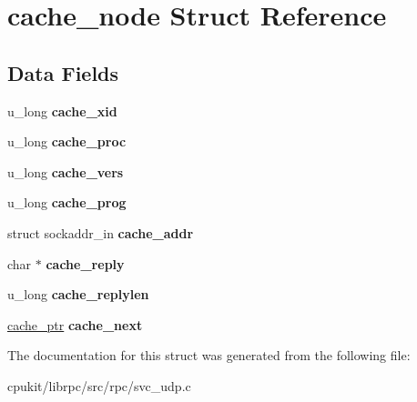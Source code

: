 \hypertarget{structcache__node}{}\section{cache\+\_\+node Struct Reference}
\label{structcache__node}
\subsection*{Data Fields}
\begin{DoxyCompactItemize}
\item 
\mbox{\label{structcache__node_a838ca6e70e06f445e76768a192219943}} 
u\+\_\+long {\bfseries cache\+\_\+xid}
\item 
\mbox{\label{structcache__node_a647ddf95f6ae5a3fc101b30ac53f0fea}} 
u\+\_\+long {\bfseries cache\+\_\+proc}
\item 
\mbox{\label{structcache__node_afd81e63a7f58513693df882ec0f864fa}} 
u\+\_\+long {\bfseries cache\+\_\+vers}
\item 
\mbox{\label{structcache__node_a3c1d41386f56f8b4fb461a7357da677d}} 
u\+\_\+long {\bfseries cache\+\_\+prog}
\item 
\mbox{\label{structcache__node_ae2e0a4b68f15188dc424bd819aa03a96}} 
struct sockaddr\+\_\+in {\bfseries cache\+\_\+addr}
\item 
\mbox{\label{structcache__node_a157fef3c77d8dad5522d9a761f27d7de}} 
char $\ast$ {\bfseries cache\+\_\+reply}
\item 
\mbox{\label{structcache__node_aa5dd254273f595958defd984cec56e46}} 
u\+\_\+long {\bfseries cache\+\_\+replylen}
\item 
\mbox{\label{structcache__node_a78513832f32d5a7940bcf4f4d8f2f4ae}} 
\mbox{\hyperlink{structcache__node}{cache\+\_\+ptr}} {\bfseries cache\+\_\+next}
\end{DoxyCompactItemize}


The documentation for this struct was generated from the following file\+:\begin{DoxyCompactItemize}
\item 
cpukit/librpc/src/rpc/svc\+\_\+udp.\+c\end{DoxyCompactItemize}
